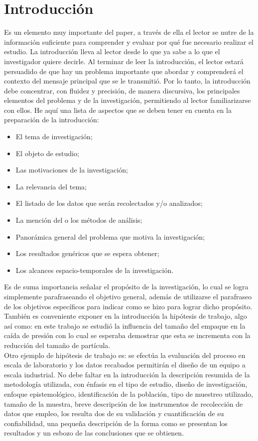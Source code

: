 \documentclass[10pt, a4paper,notitlepage]{article}
\begin{document}
\section{Introducción}
Es un elemento muy importante del paper, a través de ella el lector se nutre de la información 
suficiente para  comprender y evaluar por qué fue necesario realizar el estudio.
La introducción lleva al lector desde lo que ya sabe a lo que el investigador quiere decirle. Al
terminar de leer la introducción, el lector estará persuadido de que hay un problema
importante que abordar y comprenderá el contexto del mensaje principal que se le transmitió.
Por lo tanto, la introducción debe concentrar, con fluidez y precisión, de manera discursiva, los
principales elementos del problema y de la investigación, permitiendo al lector familiarizarse
con ellos.
He aquí una lista de aspectos que se deben tener en cuenta en la preparación de la introducción:
\begin{itemize}
	\item El tema de investigación; 
	\item El objeto de estudio; 
	\item Las motivaciones de la investigación; 
	\item La relevancia del tema; 
	\item El listado de los datos que serán recolectados y/o analizados; 
	\item La mención del o los métodos de análisis; 
	\item Panorámica general del problema que motiva la investigación; 
	\item Los resultados genéricos que se espera obtener; 
	\item Los alcances espacio-temporales de la investigación. 
\end{itemize}

Es de suma importancia señalar el propósito de la investigación, lo cual se logra simplemente 
parafraseando   el  objetivo   general,   además   de   utilizarse   el   parafraseo   de   los   objetivos 
específicos para indicar como se hizo para lograr dicho propósito.\\
También es conveniente exponer en la introducción la hipótesis de trabajo, algo así 
como: en este trabajo se estudió la influencia del tamaño del empaque en la caída de presión con lo cual 
se esperaba demostrar que esta se incrementa con la reducción del tamaño de partícula.\\
Otro ejemplo  de  hipótesis  de  trabajo  es: se  efectúa  la  evaluación  del  proceso  en  escala  de 
laboratorio y los datos recabados permitirán el diseño de un equipo a escala industrial.
No  debe  faltar  en  la  introducción  la  descripción  resumida  de  la  metodología  utilizada,  con 
énfasis en el tipo de estudio, diseño de investigación, enfoque epistemológico, identificación de 
la  población,  tipo  de  muestreo  utilizado,  tamaño  de  la  muestra,  breve  descripción  de  los 
instrumentos   de   recolección   de   datos   que   empleo,   los   resulta
dos   de   su   validación   y cuantificación de su confiabilidad, una pequeña descripción de la forma como se presentan los 
resultados y un esbozo de las conclusiones que se obtienen.
\end{document}
